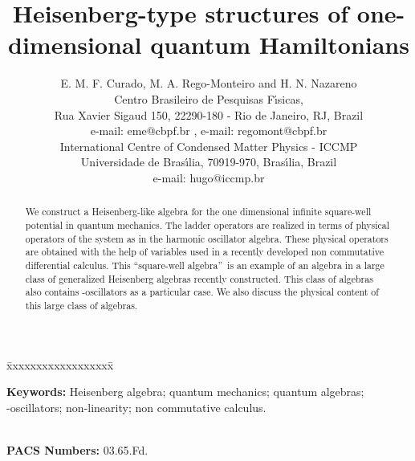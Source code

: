 \documentclass[a4paper,12pt]{article}
\begin{document}
 


\title{
{\Large \bf Heisenberg-type  structures of one-dimensional 
quantum Hamiltonians  }
}

\author{
E. M. F. Curado\coordHE{}, M. A. Rego-Monteiro\coordHE{} and H. N. Nazareno\coordHE{} \\
\myHighlight{$^{\&}$}\coordHE{} Centro Brasileiro de Pesquisas F\'\i sicas, \\ 
Rua Xavier Sigaud 150, 22290-180 - Rio de Janeiro, RJ, Brazil \\
\coordHE{} e-mail: eme@cbpf.br ,
\coordHE{} e-mail: regomont@cbpf.br \\
\myHighlight{$^{\star}$}\coordHE{} International Centre of Condensed Matter Physics - ICCMP \\
Universidade de Bras\'{\i}lia, 70919-970, Bras\'{\i}lia, Brazil \\
\coordHE{} e-mail: hugo@iccmp.br
}

\maketitle

\begin{abstract}
 
\indent
 
We construct a Heisenberg-like algebra
for the one dimensional infinite square-well 
potential in quantum mechanics. The  ladder 
operators
are realized in terms of physical operators of the
system as in the harmonic oscillator algebra.
These physical operators are
obtained with the help of variables used in a 
recently developed non commutative differential 
calculus.  
This \textquotedblleft square-well algebra\textquotedblright \,  
is an example of an algebra in a large class of 
generalized Heisenberg algebras recently constructed. 
This class of algebras also contains \coordHE{}-oscillators as a
particular case.
We also discuss the physical content of this large 
class of algebras. 



\end{abstract}

\vspace{1cm}



\begin{tabbing}

\=xxxxxxxxxxxxxxxxxx\= \kill

{\bf Keywords:}  Heisenberg algebra; quantum mechanics;
quantum algebras;\\ \coordHE{}-oscillators; non-linearity;  
non commutative calculus. 

 \\

{\bf PACS Numbers:} 03.65.Fd.

\end{tabbing}
\end{document}
